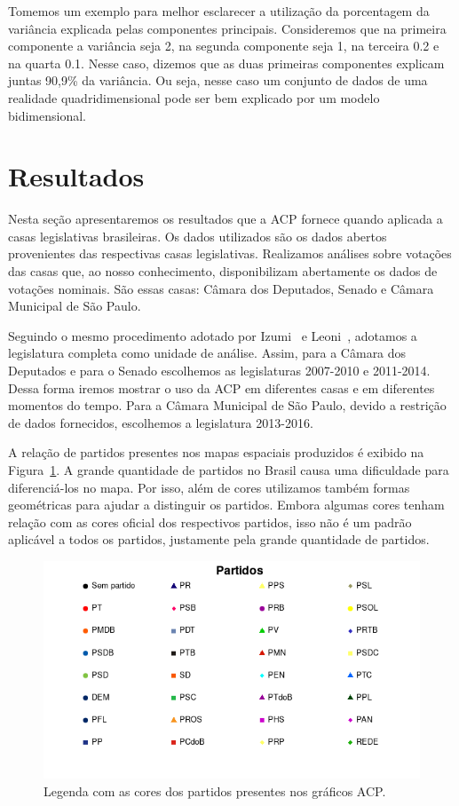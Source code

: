 \documentclass[a4paper, 12pt]{article}
\begin{document}
Tomemos um exemplo para melhor esclarecer a utilização da porcentagem da variância explicada pelas componentes principais. Consideremos que na primeira componente a variância seja 2, na segunda componente seja 1, na terceira 0.2 e na quarta 0.1. Nesse caso, dizemos que as duas primeiras componentes explicam juntas 90,9\% da variância. Ou seja, nesse caso um conjunto de dados de uma realidade quadridimensional pode ser bem explicado por um modelo bidimensional.

\section{Resultados}
\label{sec:resultados}

Nesta seção apresentaremos os resultados que a ACP fornece quando aplicada a casas legislativas brasileiras. Os dados utilizados são os dados abertos provenientes das respectivas casas legislativas. Realizamos análises sobre votações das casas que, ao nosso conhecimento, disponibilizam abertamente os dados de votações nominais. São essas casas: Câmara dos Deputados, Senado e Câmara Municipal de São Paulo.

Seguindo o mesmo procedimento adotado por Izumi~\cite{izumi2016senado} e Leoni~\cite{leoni02cdep}, adotamos a legislatura completa como unidade de análise. Assim, para a Câmara dos Deputados e para o Senado escolhemos as legislaturas 2007-2010 e 2011-2014. Dessa forma iremos mostrar o uso da ACP em diferentes casas e em diferentes momentos do tempo. Para a Câmara Municipal de São Paulo, devido a restrição de dados fornecidos, escolhemos a legislatura 2013-2016. 

A relação de partidos presentes nos mapas espaciais produzidos é exibido na Figura~\ref{fig:partidos}. A grande quantidade de partidos no Brasil causa uma dificuldade para diferenciá-los no mapa. Por isso, além de cores utilizamos também formas geométricas para ajudar a distinguir os partidos. Embora algumas cores tenham relação com as cores oficial dos respectivos partidos, isso não é um padrão aplicável a todos os partidos, justamente pela grande quantidade de partidos.

\begin{figure}[h!]
  \centering
  \includegraphics[scale=0.8]{figs/partidos.png}
  \caption{Legenda com as cores dos partidos presentes nos gráficos ACP.}
  \label{fig:partidos}
\end{figure}
\end{document}
